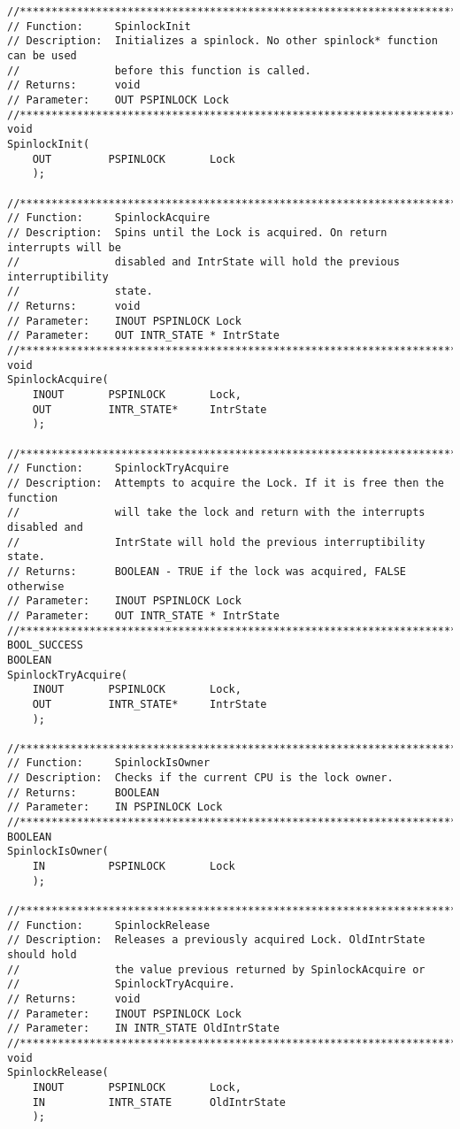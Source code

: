 \begin{appendices}
\begin{lstlisting}[caption={Spinlock Interface},label={lst:Spinlock}]
//******************************************************************************
// Function:     SpinlockInit
// Description:  Initializes a spinlock. No other spinlock* function can be used
//               before this function is called.
// Returns:      void
// Parameter:    OUT PSPINLOCK Lock
//******************************************************************************
void
SpinlockInit(
    OUT         PSPINLOCK       Lock
    );

//******************************************************************************
// Function:     SpinlockAcquire
// Description:  Spins until the Lock is acquired. On return interrupts will be
//               disabled and IntrState will hold the previous interruptibility
//               state.
// Returns:      void
// Parameter:    INOUT PSPINLOCK Lock
// Parameter:    OUT INTR_STATE * IntrState
//******************************************************************************
void
SpinlockAcquire(
    INOUT       PSPINLOCK       Lock,
    OUT         INTR_STATE*     IntrState
    );

//******************************************************************************
// Function:     SpinlockTryAcquire
// Description:  Attempts to acquire the Lock. If it is free then the function
//               will take the lock and return with the interrupts disabled and
//               IntrState will hold the previous interruptibility state.
// Returns:      BOOLEAN - TRUE if the lock was acquired, FALSE otherwise
// Parameter:    INOUT PSPINLOCK Lock
// Parameter:    OUT INTR_STATE * IntrState
//******************************************************************************
BOOL_SUCCESS
BOOLEAN
SpinlockTryAcquire(
    INOUT       PSPINLOCK       Lock,
    OUT         INTR_STATE*     IntrState
    );

//******************************************************************************
// Function:     SpinlockIsOwner
// Description:  Checks if the current CPU is the lock owner.
// Returns:      BOOLEAN
// Parameter:    IN PSPINLOCK Lock
//******************************************************************************
BOOLEAN
SpinlockIsOwner(
    IN          PSPINLOCK       Lock
    );

//******************************************************************************
// Function:     SpinlockRelease
// Description:  Releases a previously acquired Lock. OldIntrState should hold
//               the value previous returned by SpinlockAcquire or
//               SpinlockTryAcquire.
// Returns:      void
// Parameter:    INOUT PSPINLOCK Lock
// Parameter:    IN INTR_STATE OldIntrState
//******************************************************************************
void
SpinlockRelease(
    INOUT       PSPINLOCK       Lock,
    IN          INTR_STATE      OldIntrState
    );
\end{lstlisting}


\end{appendices}
